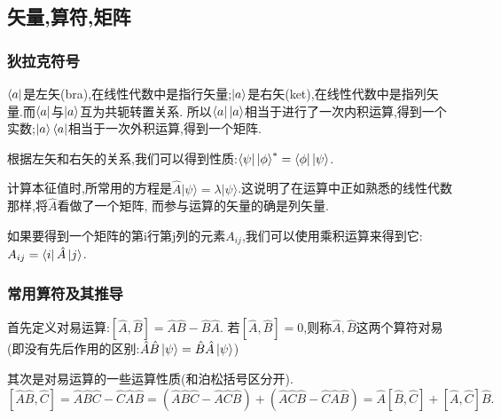 \documentclass[UTF8,a4paper,10pt]{ctexart}
\begin{document}
\subsection{矢量,算符,矩阵}
\subsubsection{狄拉克符号}
$\Bra{a}$是左矢(bra),在线性代数中是指行矢量;$\Ket{a}$是右矢(ket),在线性代数中是指列矢量.而$\Bra{a}$与$\Ket{a}$互为共轭转置关系.
所以$\Bra{a}\Ket{a}$相当于进行了一次内积运算,得到一个实数;$\Ket{a}\Bra{a}$相当于一次外积运算,得到一个矩阵.\newline

根据左矢和右矢的关系,我们可以得到性质:$\Bra{\psi}\Ket{\phi}^{*}=\Bra{\phi}\Ket{\psi}$.\newline

计算本征值时,所常用的方程是$\hat{A}|\psi\rangle=\lambda|\psi\rangle$.这说明了在运算中正如熟悉的线性代数那样,将$\hat{A}$看做了一个矩阵,
而参与运算的矢量的确是列矢量.\newline

如果要得到一个矩阵的第i行第j列的元素$A_{ij}$,我们可以使用乘积运算来得到它:$A_{ij}=\Bra{i}\hat{A}\Ket{j}$.\newline

\subsubsection{常用算符及其推导}
首先定义对易运算:$[\hat{A},\hat{B}]=\hat{A}\hat{B}-\hat{B}\hat{A}$.
若$[\hat{A},\hat{B}]=0$,则称$\hat{A},\hat{B}$这两个算符对易(即没有先后作用的区别:$\hat{A}\hat{B}\Ket{\psi}=\hat{B}\hat{A}\Ket{\psi}$)\newline

其次是对易运算的一些运算性质(和泊松括号区分开).\\
$[\hat{A}\hat{B},\hat{C}]=\hat{A}\hat{B}\hat{C}-\hat{C}\hat{A}\hat{B}=(\hat{A}\hat{B}\hat{C}-\hat{A}\hat{C}\hat{B})+(\hat{A}\hat{C}\hat{B}-\hat{C}\hat{A}\hat{B})
=\hat{A}[\hat{B},\hat{C}]+[\hat{A},\hat{C}]\hat{B}.$
\end{document}
